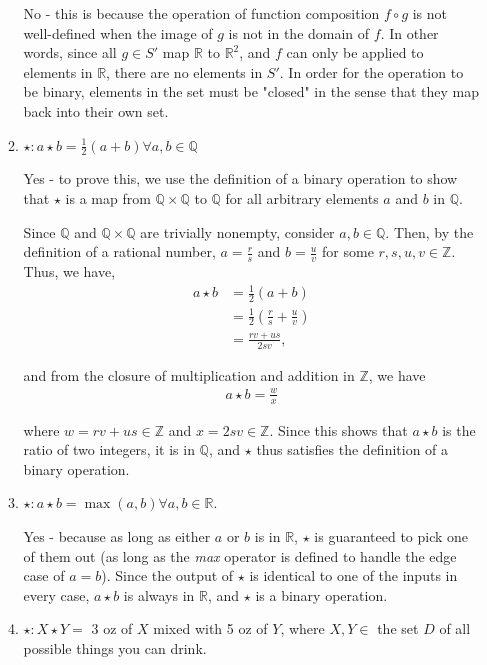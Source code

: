 \documentclass{scrartcl}
\begin{document}
\begin{enumerate}
\begin{enumerate}
				No - this is because the operation of function composition $f \circ g$ is not well-defined when the image of $g$ is not in the domain of $f$. In other words, since all $g \in S'$ map $\mathbb{R}$ to $\mathbb{R}^2$, and $f$ can only be applied to elements in $\mathbb{R}$, there are no elements in $S'$. In order for the operation to be binary, elements in the set must be "closed" in the sense that they map back into their own set.
			
			\item $\star : a\star b = \frac{1}{2}(a+b) \forall a,b \in \mathbb{Q}$
			
				Yes - to prove this, we use the definition of a binary operation to show that $\star$ is a map from $\mathbb{Q} \times \mathbb{Q}$ to $\mathbb{Q}$ for all arbitrary elements $a$ and $b$ in $\mathbb{Q}$.
				
				Since $\mathbb{Q}$ and $\mathbb{Q} \times \mathbb{Q}$ are trivially nonempty, consider $a,b \in \mathbb{Q}$. Then, by the definition of a rational number, $a = \frac{r}{s}$ and $b = \frac{u}{v}$ for some $r,s,u,v \in \mathbb{Z}$.
				Thus, we have,
				\begin{align*}
					a \star b &= \frac{1}{2}(a+b) \\
					&= \frac{1}{2}(\frac{r}{s} + \frac{u}{v}) \\
					&= \frac{rv + us}{2sv},
				\end{align*}
				
				and from the closure of multiplication and addition in $\mathbb{Z}$, we have
				\begin{align*}
					a\star b = \frac{w}{x}
				\end{align*}
				
				where $w = rv + us \in \mathbb{Z}$ and $x = 2sv \in \mathbb{Z}$. Since this shows that $a\star b$ is the ratio of two integers, it is in $\mathbb{Q}$, and $\star$ thus satisfies the definition of a binary operation.
				
			
			\item $\star : a\star b = \max(a,b) \forall a,b \in \mathbb{R}$.
			
				Yes - because as long as either $a$ or $b$ is in $\mathbb{R}$, $\star$ is guaranteed to pick one of them out (as long as the \textit{max} operator is defined to handle the edge case of $a=b$). Since the output of $\star$ is identical to one of the inputs in every case, $a\star b$ is always in $\mathbb{R}$, and $\star$ is a binary operation.
			
			\item $\star : X \star Y = $ 3 oz of $X$ mixed with 5 oz of $Y$, where $X, Y \in $ the set $D$ of all possible things you can drink.
			

\end{enumerate}
\end{enumerate}
\end{document}
